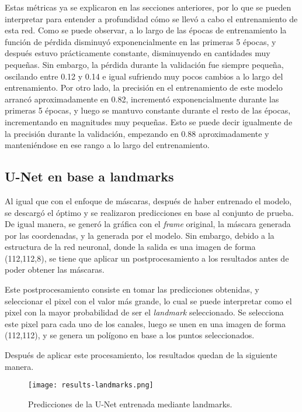 \documentclass[runningheads]{llncs}
\begin{document}
Estas métricas ya se explicaron en las secciones anteriores, por lo que se pueden interpretar para entender a profundidad cómo se llevó a cabo el entrenamiento de esta red. Como se puede observar, a lo largo de las épocas de entrenamiento la función de pérdida disminuyó exponencialmente en las primeras 5 épocas, y después estuvo prácticamente constante, disminuyendo en cantidades muy pequeñas. Sin embargo, la pérdida durante la validación fue siempre pequeña, oscilando entre 0.12 y 0.14 e igual sufriendo muy pocos cambios a lo largo del entrenamiento. Por otro lado, la precisión en el entrenamiento de este modelo arrancó aproximadamente en 0.82, incrementó exponencialmente durante las primeras 5 épocas, y luego se mantuvo constante durante el resto de las épocas, incrementando en magnitudes muy pequeñas. Esto se puede decir igualmente de la precisión durante la validación, empezando en 0.88 aproximadamente y manteniéndose en ese rango a lo largo del entrenamiento. 

\subsection{U-Net en base a landmarks}
Al igual que con el enfoque de máscaras, después de haber entrenado el modelo, se descargó el óptimo y se realizaron predicciones en base al conjunto de prueba. De igual manera, se generó la gráfica con el \textit{frame} original, la máscara generada por las coordenadas, y la generada por el modelo. Sin embargo, debido a la estructura de la red neuronal, donde la salida es una imagen de forma (112,112,8), se tiene que aplicar un postprocesamiento a los resultados antes de poder obtener las máscaras. 

Este postprocesamiento consiste en tomar las predicciones obtenidas, y seleccionar el pixel con el valor más grande, lo cual se puede interpretar como el pixel con la mayor probabilidad de ser el \textit{landmark} seleccionado. Se selecciona este pixel para cada uno de los canales, luego se unen en una imagen de forma (112,112), y se genera un polígono en base a los puntos seleccionados. 

Después de aplicar este procesamiento, los resultados quedan de la siguiente manera.

\begin{figure}[H]
    \centering
    \texttt{[image: results-landmarks.png]}
    \caption{Predicciones de la U-Net entrenada mediante landmarks.}
\end{figure}
\end{document}
